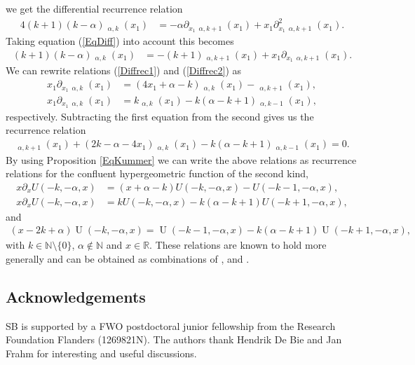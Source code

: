 \documentclass{amsart}
\numberwithin{theorem}{section}
\theoremstyle{definition}
\theoremstyle{remark}
\def\R{\mathds{R} }
\def\N{\mathds{N} }
\DeclareMathOperator{\KU}{U}
\DeclareMathOperator{\KO}{\widetilde U}
\newcommand{\pt}[1]{\partial_{#1}}
\begin{document}
we get the differential recurrence relation
\begin{align*}
4(k+1)(k-\alpha)\KO_{\alpha, k}(x_1) &=  -\alpha\pt {x_1}\KO_{\alpha, k+1}(x_1) + x_1 \pt {x_1}^2 \KO_{\alpha, k+1}(x_1).
\end{align*}
Taking equation (\ref{EqDiff}) into account this becomes
\begin{align}\label{Diffrec2}
(k+1)(k-\alpha)\KO_{\alpha, k}(x_1) &= -\left(k + 1\right)\KO_{\alpha, k+1}(x_1) + x_1\pt {x_1}\KO_{\alpha, k+1}(x_1).
\end{align}
We can rewrite relations (\ref{Diffrec1}) and (\ref{Diffrec2}) as
\begin{align*}
x_1\pt {x_1} \KO_{\alpha,k}(x_1) &= \left(4x_1+\alpha-k \right)\KO_{\alpha,k}(x_1) - \KO_{\alpha,k+1}(x_1),\\
x_1\pt {x_1} \KO_{\alpha,k}(x_1) &= k\KO_{\alpha,k}(x_1) - k(\alpha-k+1)\KO_{\alpha,k-1}(x_1),
\end{align*}
respectively. Subtracting the first equation from the second gives us the recurrence relation
\begin{align*}
\KO_{\alpha,k+1}(x_1) + (2k-\alpha-4x_1)\KO_{\alpha,k}(x_1)-k(\alpha-k+1)\KO_{\alpha,k-1}(x_1) = 0.
\end{align*}
By using Proposition \ref{EqKummer} we can write the above relations as recurrence relations for the confluent hypergeometric function of the second kind,
\begin{align*}
x\pt {x} U(-k,-\alpha,x) &= \left(x+\alpha-k \right)U(-k,-\alpha,x) - U(-k-1,-\alpha,x),\\
x\pt {x} U(-k,-\alpha,x) &= kU(-k,-\alpha,x) - k(\alpha-k+1)U(-k+1,-\alpha,x),
\end{align*}
and
\begin{align*}
(x-2k+\alpha)\KU(-k,-\alpha,x)=\KU(-k-1,-\alpha,x)-k(\alpha-k+1)\KU(-k+1,-\alpha,x),
\end{align*}
with $k\in\N\setminus \{0\}$, $\alpha\not\in \N$ and $x\in \R$. These relations are known to hold more generally and can be obtained as combinations of \cite[Equation 13.3.7]{NIST:DLMF}, \cite[Equation 13.3.10]{NIST:DLMF} and  \cite[Equation 13.3.22]{NIST:DLMF}.



\subsection*{Acknowledgements}
SB is supported by a FWO postdoctoral junior fellowship from the Research Foundation Flanders (1269821N).
The authors thank Hendrik De Bie and Jan Frahm for interesting and useful discussions. 


 

\end{document}
